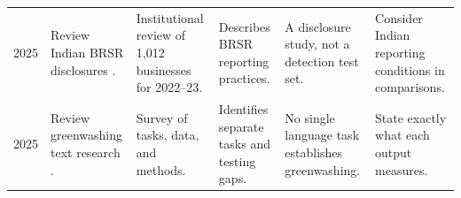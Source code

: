 {\begin{longtable}{@{}L{0.85cm}L{2.35cm}L{2.65cm}L{2.65cm}L{2.65cm}L{2.65cm}@{}}
2025 & Review Indian BRSR disclosures \cite{garg2025}. & Institutional review of 1,012 businesses for 2022--23. & Describes BRSR reporting practices. & A disclosure study, not a detection test set. & Consider Indian reporting conditions in comparisons.\\
2025 & Review greenwashing text research \cite{calamai2025}. & Survey of tasks, data, and methods. & Identifies separate tasks and testing gaps. & No single language task establishes greenwashing. & State exactly what each output measures.\\
\end{longtable}}